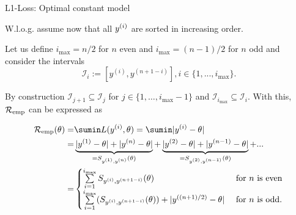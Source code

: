 \documentclass[11pt,compress,t,notes=noshow, xcolor=table]{beamer}
\begin{document}
\begin{frame}{L1-Loss: Optimal constant model}

W.l.o.g. assume now that all $y^{(i)}$ are sorted in increasing order.

Let us define $i_{\max} = n / 2$ for $n$ even and $i_{\max} = (n - 1) / 2$ for $n$ odd and consider the intervals 
$$
\mathcal{I}_i := [y^{(i)},y^{(n+1-i)}], i \in \{1, ..., i_{\max}\}. 
$$

By construction $\mathcal{I}_{j+1} \subseteq \mathcal{I}_j$ for $j \in \{1,\dots,i_{\max}-1\}$ and $\mathcal{I}_{i_{\max}} \subseteq \mathcal{I}_i$. With this, $\mathcal{R}_{\text{emp}}$ can be expressed as
\begin{footnotesize}
\begin{align*}
\riske(\theta) =& \sumin L(\yi,\theta) = \sumin|\yi - \theta| \\ 
=& \underbrace{|\yi[1] - \theta| + |\yi[n] - \theta|}_{= S_{\yi[1], \yi[n]}(\theta)} + \underbrace{|\yi[2] - \theta| + |\yi[n - 1] - \theta|}_{= S_{\yi[2], \yi[n - 1]}(\theta)} + ...  \\
=& \begin{cases} \sum\limits_{i = 1}^{i_{\max}} S_{\yi, \yi[n + 1 - i]}(\theta) & \text{ for } n \text{ is even} \\
\sum\limits_{i = 1}^{i_{\max}} (S_{\yi, \yi[n + 1 - i]}(\theta)) + |\yi[(n + 1)/2] - \theta| & \text{ for } n \text{ is odd}. \end{cases}
\end{align*}
\end{footnotesize}

\end{frame}
\end{document}

